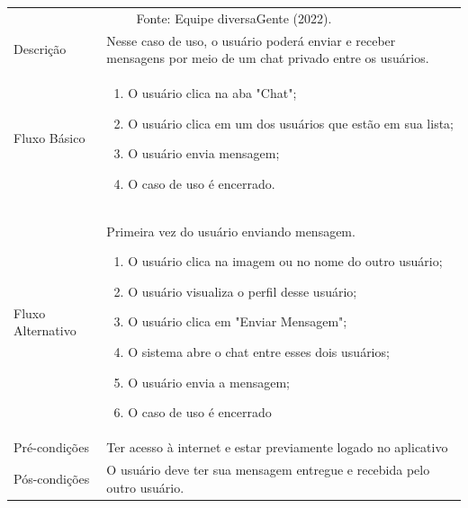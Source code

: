 \begin{apendicesenv}
	\begin{quadro}[htb]
		\centering
		\ABNTEXfontereduzida
		\caption[Caso de Uso Troca de mensagens de texto em chat individual]{Caso de Uso Troca de mensagens de texto em chat individual}
		\label{casos-de-uso15}
	\end{quadro}
	
	\begin{longtable}{|p{3.3cm}|p{12.3cm}|}
		\hline
		\thead{} & \thead{Ator} \\
		\hline
		
										
		\endfirsthead
		\multicolumn{2}{c}{\scriptsize Fonte: Equipe diversaGente (2022).}%
		{{ \autoref{casos-de-uso15} continued from previous page}} \\
		\endhead
		
		Descrição &Nesse caso de uso, o usuário poderá enviar e receber mensagens por meio de um chat privado entre os usuários.\\
		\hline
		Fluxo Básico  & 
		\begin{enumerate}
			\item O usuário clica na aba "Chat";
			\item O usuário clica em um dos usuários que estão em sua lista;
			\item O usuário envia mensagem;
			\item O caso de uso é encerrado. 
		\end{enumerate}\\
		\hline
		Fluxo Alternativo & 
		Primeira vez do usuário enviando mensagem. 
		\begin{enumerate}
			\item O usuário clica na imagem ou no nome do outro usuário;
			\item O usuário visualiza o perfil desse usuário;
			\item O usuário clica em "Enviar Mensagem";
			\item O sistema abre o chat entre esses dois usuários;
			\item O usuário envia a mensagem;
			\item O caso de uso é encerrado 
		\end{enumerate}\\
		\hline
		Pré-condições & Ter acesso à internet e estar previamente logado no aplicativo\\
		\hline
		Pós-condições & O usuário deve ter sua mensagem entregue e recebida pelo outro usuário.\\
		\hline
	\end{longtable}
	

\end{apendicesenv}
